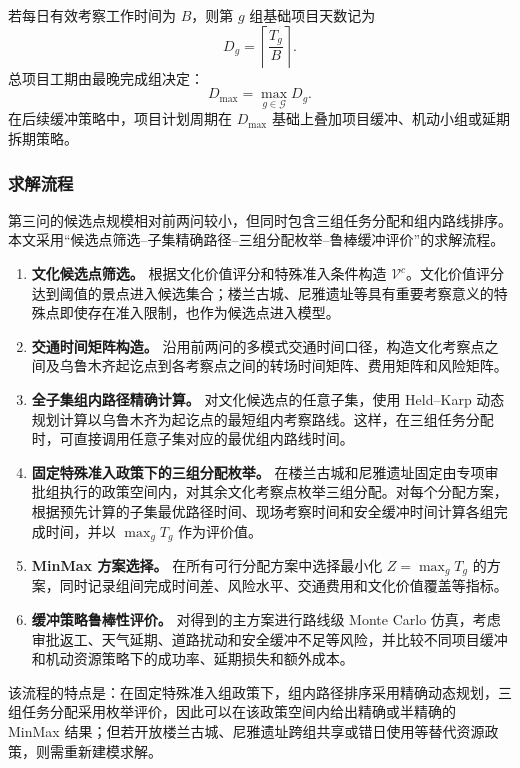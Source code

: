 \documentclass[UTF8,zihao=-4,a4paper]{ctexart}
\begin{document}
若每日有效考察工作时间为 $B$，则第 $g$ 组基础项目天数记为
\[
D_g=\left\lceil\frac{T_g}{B}\right\rceil .
\]
总项目工期由最晚完成组决定：
\[
D_{\max}=\max_{g\in\mathcal{G}}D_g.
\]
在后续缓冲策略中，项目计划周期在 $D_{\max}$ 基础上叠加项目缓冲、机动小组或延期拆期策略。

\subsubsection{求解流程}
\label{subsubsec:q3_solution_process}

第三问的候选点规模相对前两问较小，但同时包含三组任务分配和组内路线排序。本文采用“候选点筛选--子集精确路径--三组分配枚举--鲁棒缓冲评价”的求解流程。

\begin{enumerate}
    \item \textbf{文化候选点筛选。}
    根据文化价值评分和特殊准入条件构造 $\mathcal{V}^{c}$。文化价值评分达到阈值的景点进入候选集合；楼兰古城、尼雅遗址等具有重要考察意义的特殊点即使存在准入限制，也作为候选点进入模型。

    \item \textbf{交通时间矩阵构造。}
    沿用前两问的多模式交通时间口径，构造文化考察点之间及乌鲁木齐起讫点到各考察点之间的转场时间矩阵、费用矩阵和风险矩阵。

    \item \textbf{全子集组内路径精确计算。}
    对文化候选点的任意子集，使用 Held--Karp 动态规划计算以乌鲁木齐为起讫点的最短组内考察路线。这样，在三组任务分配时，可直接调用任意子集对应的最优组内路线时间。

    \item \textbf{固定特殊准入政策下的三组分配枚举。}
    在楼兰古城和尼雅遗址固定由专项审批组执行的政策空间内，对其余文化考察点枚举三组分配。对每个分配方案，根据预先计算的子集最优路径时间、现场考察时间和安全缓冲时间计算各组完成时间，并以 $\max_g T_g$ 作为评价值。

    \item \textbf{MinMax 方案选择。}
    在所有可行分配方案中选择最小化 $Z=\max_gT_g$ 的方案，同时记录组间完成时间差、风险水平、交通费用和文化价值覆盖等指标。

    \item \textbf{缓冲策略鲁棒性评价。}
    对得到的主方案进行路线级 Monte Carlo 仿真，考虑审批返工、天气延期、道路扰动和安全缓冲不足等风险，并比较不同项目缓冲和机动资源策略下的成功率、延期损失和额外成本。
\end{enumerate}

该流程的特点是：在固定特殊准入组政策下，组内路径排序采用精确动态规划，三组任务分配采用枚举评价，因此可以在该政策空间内给出精确或半精确的 MinMax 结果；但若开放楼兰古城、尼雅遗址跨组共享或错日使用等替代资源政策，则需重新建模求解。
\end{document}
